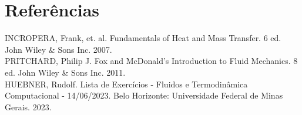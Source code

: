 \section{Referências}

\noindent INCROPERA, Frank, et. al. Fundamentals of Heat and Mass Transfer. 6 ed. John Wiley \& Sons
Inc. 2007. \\

\noindent PRITCHARD, Philip J. Fox and McDonald's Introduction to Fluid Mechanics. 8 ed. John Wiley \& Sons
Inc. 2011. \\

\noindent HUEBNER, Rudolf. Lista de Exercícios - Fluidos e Termodinâmica Computacional - 14/06/2023. Belo Horizonte: Universidade
Federal de Minas Gerais. 2023.